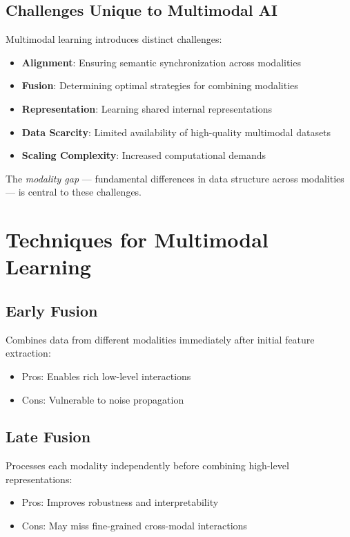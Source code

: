 \documentclass[openany]{book}
\begin{document}
\subsection{Challenges Unique to Multimodal AI}
Multimodal learning introduces distinct challenges:
\begin{itemize}
    \item \textbf{Alignment}: Ensuring semantic synchronization across 
    modalities
    \item \textbf{Fusion}: Determining optimal strategies for combining 
    modalities
    \item \textbf{Representation}: Learning shared internal representations
    \item \textbf{Data Scarcity}: Limited availability of high-quality 
    multimodal datasets
    \item \textbf{Scaling Complexity}: Increased computational demands
\end{itemize}

The \textit{modality gap} — fundamental differences in data structure across 
modalities — is central to these challenges.

\section{Techniques for Multimodal Learning}

\subsection{Early Fusion}
Combines data from different modalities immediately after initial feature 
extraction:
\begin{itemize}
    \item Pros: Enables rich low-level interactions
    \item Cons: Vulnerable to noise propagation
\end{itemize}

\subsection{Late Fusion}
Processes each modality independently before combining high-level 
representations:
\begin{itemize}
    \item Pros: Improves robustness and interpretability
    \item Cons: May miss fine-grained cross-modal interactions
\end{itemize}
\end{document}

